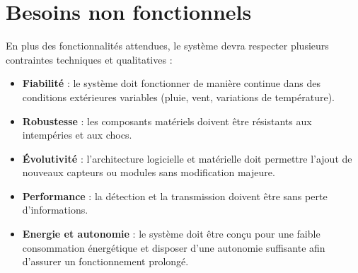 \section{Besoins non fonctionnels}

En plus des fonctionnalités attendues, le système devra respecter plusieurs contraintes techniques et qualitatives :

\small
\begin{itemize}
    \item \textbf{Fiabilité} : le système doit fonctionner de manière continue dans des conditions extérieures variables (pluie, vent, variations de température).
    \item \textbf{Robustesse} : les composants matériels doivent être résistants aux intempéries et aux chocs.
    \item \textbf{Évolutivité} : l’architecture logicielle et matérielle doit permettre l’ajout de nouveaux capteurs ou modules sans modification majeure.
    \item \textbf{Performance} : la détection et la transmission doivent être sans perte d’informations.
    \item \textbf{Energie et autonomie} : le système doit être conçu pour une faible consommation énergétique et disposer d’une autonomie suffisante afin d’assurer un fonctionnement prolongé.
\end{itemize}